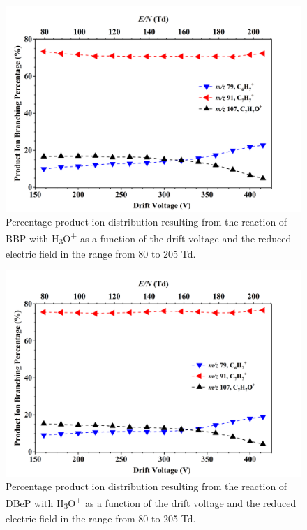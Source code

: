 \begin{figure}
\centering
\includegraphics[height=0.4\textheight]{pics/BBP-BR.png}
\caption{Percentage product ion distribution resulting from the reaction of BBP with H\textsubscript{3}O\textsuperscript{+} as a function of the drift voltage and the reduced electric field in the range from 80 to 205 Td.}
\label{fig:BBP_fs}
\end{figure}

\begin{figure}
\centering
\includegraphics[height=0.4\textheight]{pics/DBeP-BR.png}
\caption{Percentage product ion distribution resulting from the reaction of DBeP with H\textsubscript{3}O\textsuperscript{+} as a function of the drift voltage and the reduced electric field in the range from 80 to 205 Td.}
\label{fig:DBeP_fs}
\end{figure}




